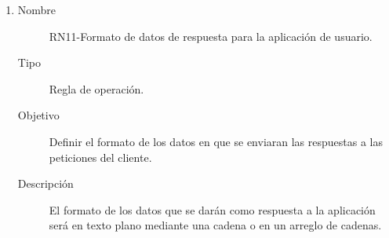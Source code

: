 \begin{enumerate}[label=RN\arabic*.]
\item \label{RN11}
		\begin{description}
			\item[Nombre] RN11-Formato de datos de respuesta para la aplicación de usuario.
			\item[Tipo] Regla de operación.
			\item[Objetivo] Definir el formato de los datos en que se enviaran las respuestas a las peticiones del cliente.
			\item[Descripción] El formato de los datos que se darán como respuesta a la aplicación será en texto plano mediante una cadena o en un arreglo de cadenas.
		\end{description}

		


\end{enumerate}